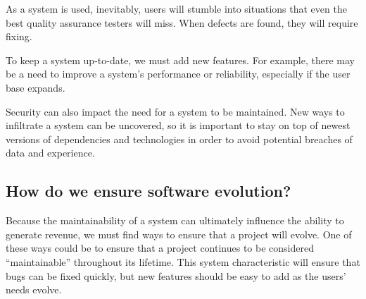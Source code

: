 As a system is used, inevitably, users will stumble into situations that even the best quality assurance testers will miss. When defects are found, they will require fixing. 

To keep a system up-to-date, we must add new features. For example, there may be a need to improve a system's performance or reliability, especially if the user base expands. 

Security can also impact the need for a system to be maintained. New ways to infiltrate a system can be uncovered, so it is important to stay on top of newest versions of dependencies and technologies in order to avoid potential breaches of data and experience.

\subsection{How do we ensure software evolution?} \label{subEnsureEvolution}

Because the maintainability of a system can ultimately influence the ability to generate revenue, we must find ways to ensure that a project will evolve. One of these ways could be to ensure that a project continues to be considered ``maintainable'' throughout its lifetime. This system characteristic will ensure that bugs can be fixed quickly, but new features should be easy to add as the users' needs evolve.
